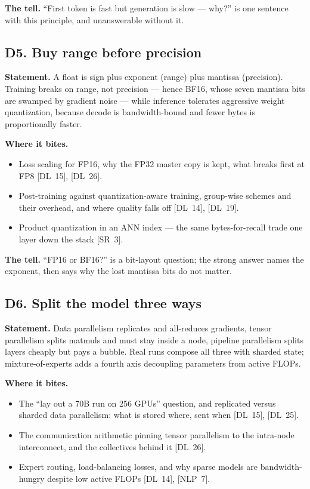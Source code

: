 \textbf{The tell.} ``First token is fast but generation is slow --- why?'' is one sentence with this principle, and unanswerable without it.

\subsection*{D5. Buy range before precision}

\textbf{Statement.} A float is sign plus exponent (range) plus mantissa (precision). Training breaks on range, not precision --- hence BF16, whose seven mantissa bits are swamped by gradient noise --- while inference tolerates aggressive weight quantization, because decode is bandwidth-bound and fewer bytes is proportionally faster.

\textbf{Where it bites.}
\begin{itemize}[itemsep=1pt,topsep=2pt,leftmargin=1.3em]
\item Loss scaling for FP16, why the FP32 master copy is kept, what breaks first at FP8 [DL~15], [DL~26].
\item Post-training against quantization-aware training, group-wise schemes and their overhead, and where quality falls off [DL~14], [DL~19].
\item Product quantization in an ANN index --- the same bytes-for-recall trade one layer down the stack [SR~3].
\end{itemize}

\textbf{The tell.} ``FP16 or BF16?'' is a bit-layout question; the strong answer names the exponent, then says why the lost mantissa bits do not matter.

\subsection*{D6. Split the model three ways}

\textbf{Statement.} Data parallelism replicates and all-reduces gradients, tensor parallelism splits matmuls and must stay inside a node, pipeline parallelism splits layers cheaply but pays a bubble. Real runs compose all three with sharded state; mixture-of-experts adds a fourth axis decoupling parameters from active FLOPs.

\textbf{Where it bites.}
\begin{itemize}[itemsep=1pt,topsep=2pt,leftmargin=1.3em]
\item The ``lay out a 70B run on 256 GPUs'' question, and replicated versus sharded data parallelism: what is stored where, sent when [DL~15], [DL~25].
\item The communication arithmetic pinning tensor parallelism to the intra-node interconnect, and the collectives behind it [DL~26].
\item Expert routing, load-balancing losses, and why sparse models are bandwidth-hungry despite low active FLOPs [DL~14], [NLP~7].
\end{itemize}

